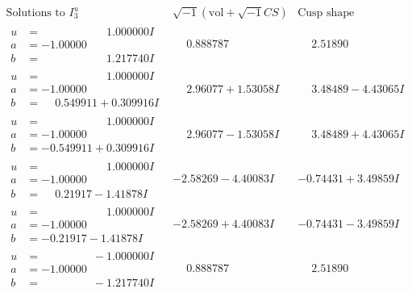\documentclass[1p]{elsarticle_modified}
\theoremstyle{definition}
\newcommand{\I}{\sqrt{-1}}
\begin{document}
$$\begin{array}{c|c|c}  
\text{Solutions to }I^u_{3}& \I (\text{vol} + \sqrt{-1}CS) & \text{Cusp shape}\\
 \hline 
\begin{aligned}
u &= \phantom{-0.000000 -}1.000000 I \\
a &= -1.00000\phantom{ +0.000000I} \\
b &= \phantom{-0.000000 -}1.217740 I\end{aligned}
 & \phantom{-}0.888787\phantom{ +0.000000I} & \phantom{-}2.51890\phantom{ +0.000000I} \\ \hline\begin{aligned}
u &= \phantom{-0.000000 -}1.000000 I \\
a &= -1.00000\phantom{ +0.000000I} \\
b &= \phantom{-}0.549911 + 0.309916 I\end{aligned}
 & \phantom{-}2.96077 + 1.53058 I & \phantom{-}3.48489 - 4.43065 I \\ \hline\begin{aligned}
u &= \phantom{-0.000000 -}1.000000 I \\
a &= -1.00000\phantom{ +0.000000I} \\
b &= -0.549911 + 0.309916 I\end{aligned}
 & \phantom{-}2.96077 - 1.53058 I & \phantom{-}3.48489 + 4.43065 I \\ \hline\begin{aligned}
u &= \phantom{-0.000000 -}1.000000 I \\
a &= -1.00000\phantom{ +0.000000I} \\
b &= \phantom{-}0.21917 - 1.41878 I\end{aligned}
 & -2.58269 - 4.40083 I & -0.74431 + 3.49859 I \\ \hline\begin{aligned}
u &= \phantom{-0.000000 -}1.000000 I \\
a &= -1.00000\phantom{ +0.000000I} \\
b &= -0.21917 - 1.41878 I\end{aligned}
 & -2.58269 + 4.40083 I & -0.74431 - 3.49859 I \\ \hline\begin{aligned}
u &= \phantom{-0.000000 } -1.000000 I \\
a &= -1.00000\phantom{ +0.000000I} \\
b &= \phantom{-0.000000 } -1.217740 I\end{aligned}
 & \phantom{-}0.888787\phantom{ +0.000000I} & \phantom{-}2.51890\phantom{ +0.000000I} \\ \hline\begin{aligned}

\end{aligned}
\end{array}$$
\end{document}
